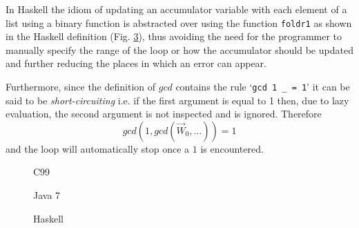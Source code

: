 In Haskell the idiom of updating an accumulator variable with each element of a list using a binary function is abstracted over using the function \lstinline|foldr1| as shown in the Haskell definition (Fig. \ref{fig:gcds:haskell}), thus avoiding the need for the programmer to manually specify the range of the loop or how the accumulator should be updated and further reducing the places in which an error can appear.

Furthermore, since the definition of $gcd$ contains the rule `\lstinline|gcd 1 _ = 1|' it can be said to be \emph{short-circuiting} i.e. if the first argument is equal to 1 then, due to lazy evaluation, the second argument is not inspected and is ignored. Therefore $$gcd (1, gcd (\vec{W}_0,\ldots )) = 1$$ and the loop will automatically stop once a $1$ is encountered.

\begin{figure}

\caption{C99}
\label{fig:gcds:c}
\end{figure}
\begin{figure}

\caption{Java 7}
\label{fig:gcds:java}
\end{figure}
\begin{figure}

\caption{Haskell}
\label{fig:gcds:haskell}
\end{figure}






